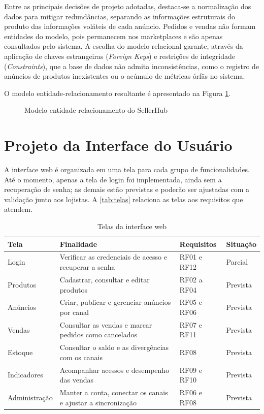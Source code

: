 Entre as principais decisões de projeto adotadas, destaca-se a normalização dos dados para mitigar redundâncias, separando as informações estruturais do produto das informações voláteis de cada anúncio. Pedidos e vendas não formam entidades do modelo, pois permanecem nos marketplaces e são apenas consultados pelo sistema. A escolha do modelo relacional garante, através da aplicação de chaves estrangeiras (\textit{Foreign Keys}) e restrições de integridade (\textit{Constraints}), que a base de dados não admita inconsistências, como o registro de anúncios de produtos inexistentes ou o acúmulo de métricas órfãs no sistema.

O modelo entidade-relacionamento resultante é apresentado na Figura \ref{fig:modelo_conceitual_banco_dados}.

\begin{figure}[htbp]
    \centering
    \caption{Modelo entidade-relacionamento do SellerHub}
    \label{fig:modelo_conceitual_banco_dados}
    \resizebox{\linewidth}{!}{}
\end{figure}

\section{Projeto da Interface do Usuário}

A interface web é organizada em uma tela para cada grupo de funcionalidades. Até o momento, apenas a tela de login foi implementada, ainda sem a recuperação de senha; as demais estão previstas e poderão ser ajustadas com a validação junto aos lojistas. A \autoref{tab:telas} relaciona as telas aos requisitos que atendem.

\begin{table}[htbp]
  \centering
  \caption{Telas da interface web}
  \label{tab:telas}
  \begin{tabularx}{\textwidth}{lXll}
    \toprule
    \textbf{Tela} & \textbf{Finalidade} & \textbf{Requisitos} & \textbf{Situação} \\
    \midrule
    Login         & Verificar as credenciais de acesso e recuperar a senha & RF01 e RF12  & Parcial \\
    Produtos      & Cadastrar, consultar e editar produtos      & RF02 a RF04  & Prevista \\
    Anúncios      & Criar, publicar e gerenciar anúncios por canal & RF05 e RF06  & Prevista \\
    Vendas        & Consultar as vendas e marcar pedidos como cancelados & RF07 e RF11  & Prevista \\
    Estoque       & Consultar o saldo e as divergências com os canais & RF08         & Prevista \\
    Indicadores   & Acompanhar acessos e desempenho das vendas  & RF09 e RF10  & Prevista \\
    Administração & Manter a conta, conectar os canais e ajustar a sincronização & RF06 e RF08  & Prevista \\
    \bottomrule
  \end{tabularx}
\end{table}

